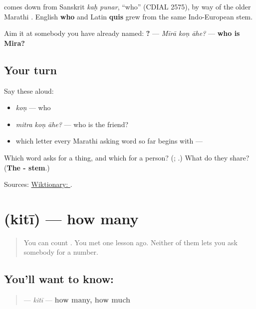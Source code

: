 \textbf{} comes down from Sanskrit \emph{kaḥ punar}, \textquotedblleft{}who\textquotedblright{} (CDIAL 2575), by way of the older Marathi \textbf{}. English \textbf{who} and Latin \textbf{quis} grew from the same Indo-European stem.

Aim it at somebody you have already named: \textbf{  ?} — \emph{Mīrā koṇ āhe?} — \textbf{who is Mira?}

\subsection*{Your turn}
Say these aloud:

\begin{itemize}
\raggedright
  \item \emph{koṇ} — who
  \item \emph{mitra koṇ āhe?} — who is the friend?
  \item which letter every Marathi asking word so far begins with — \textbf{}
\end{itemize}

\begin{tcolorbox}[breakable,colback=teal!4,colframe=teal!35!black,title={Before you move on}]
Which word asks for a thing, and which for a person? (\textbf{}; \textbf{}.) What do they share? (\textbf{The - stem}.)

Sources: \href{https://en.wiktionary.org/wiki/\%E0\%A4\%95\%E0\%A5\%8B\%E0\%A4\%A3}{Wiktionary: }.
\end{tcolorbox}
\section[\texorpdfstring{\mr{किती} (kitī)}{किती (kitī)}]{ (kitī) — how many}

\label{lesson:MR-C37-kiti}



\begin{quote}
You can count \textbf{    }. You met \textbf{} one lesson ago. Neither of them lets you ask somebody for a number.
\end{quote}

\subsection*{You'll want to know: }
\begin{quote}
\textbf{} — \emph{kitī} — \textbf{how many, how much}
\end{quote}

